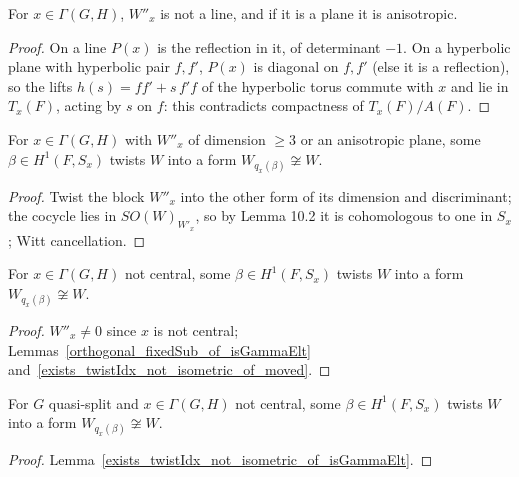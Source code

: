 \begin{lemma}
\label{orthogonal_fixedSub_of_isGammaElt}
\leanok
{}
For $x\in\Gamma(G,H)$, $W''_x$ is not a line, and if it is a plane it is anisotropic.
\end{lemma}
\begin{proof}
\leanok
On a line $P(x)$ is the reflection in it, of determinant $-1$. On a hyperbolic plane with hyperbolic pair $f,f'$,
$P(x)$ is diagonal on $f,f'$ (else it is a reflection), so the lifts $h(s)=ff'+s\,f'f$ of the hyperbolic torus commute
with $x$ and lie in $T_x(F)$, acting by $s$ on $f$: this contradicts compactness of $T_x(F)/A(F)$.
\end{proof}

\begin{lemma}
\label{exists_twistIdx_not_isometric_of_moved}
\leanok
{}
For $x\in\Gamma(G,H)$ with $W''_x$ of dimension $\ge3$ or an anisotropic plane, some $\beta\in H^1(F,S_x)$ twists $W$ into a
form $W_{q_x(\beta)}\not\cong W$.
\end{lemma}
\begin{proof}
\leanok
{}
Twist the block $W''_x$ into the other form of its dimension and discriminant; the cocycle lies in $SO(W)_{W'_x}$, so by
\cite{Kot86} Lemma 10.2 it is cohomologous to one in $S_x$; Witt cancellation.
\end{proof}

\begin{lemma}
\label{exists_twistIdx_not_isometric_of_isGammaElt}
\leanok
{}
For $x\in\Gamma(G,H)$ not central, some $\beta\in H^1(F,S_x)$ twists $W$ into a form $W_{q_x(\beta)}\not\cong W$.
\end{lemma}
\begin{proof}
\leanok
{}
$W''_x\neq0$ since $x$ is not central; Lemmas~\ref{orthogonal_fixedSub_of_isGammaElt} and~\ref{exists_twistIdx_not_isometric_of_moved}.
\end{proof}

\begin{lemma}
\label{exists_twistIdx_not_isometric}
\leanok
{}
For $G$ quasi-split and $x\in\Gamma(G,H)$ not central, some $\beta\in H^1(F,S_x)$ twists $W$ into a form $W_{q_x(\beta)}\not\cong W$.
\end{lemma}
\begin{proof}
\leanok
{}
Lemma~\ref{exists_twistIdx_not_isometric_of_isGammaElt}.
\end{proof}

